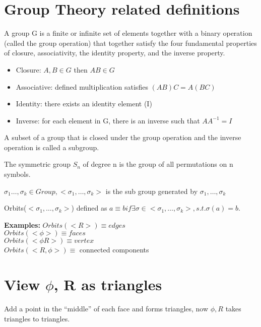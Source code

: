\documentclass[12pt]{article}
\newcommand{\eg}[1]{\par {\bf Examples: }{#1}}
\begin{document}
\section{Group Theory related definitions}
\begin{definition}
  A group G is a finite or infinite set of elements together with a
  binary operation (called the group operation) that together satisfy
  the four fundamental properties of closure, associativity, the
  identity property, and the inverse property.
  \begin{itemize}
  \item Closure: $A, B \in G$ then $A B \in G$
  \item Associative: defined multiplication satisfies $(A B) C = A (B C)$
  \item Identity: there exists an identity element (I)
  \item Inverse: for each element in G, there is an inverse such that $A A^{-1} = I$
  \end{itemize}
\end{definition}
\begin{definition}
  A subset of a group that is closed under the group operation and the
  inverse operation is called a subgroup.
\end{definition}
\begin{definition}
The symmetric group $S_n$ of degree n is the group of all permutations
on n symbols.
\end{definition}
\begin{definition}
  $\sigma_1 \dots, \sigma_k \in Group, <\sigma_1, \dots, \sigma_k>$
  is the sub group generated by $\sigma_1, \dots, \sigma_k$
\end{definition}
\begin{definition}
  Orbits($<\sigma_1, \dots, \sigma_k>$) defined as $a \equiv b if
  \exists \sigma \in <\sigma_1, \dots, \sigma_k>, s.t. \sigma(a) = b$.
\end{definition}
\eg {$Orbits(<R>) \equiv edges$}\\
{$Orbits(<\phi>) \equiv faces$}\\
{$Orbits(<\phi R>) \equiv vertex$}\\
{$Orbits(<R, \phi>) \equiv $ connected components}

\section{View $\phi$, R as triangles}
Add a point in the ``middle'' of each face and forms triangles, now $\phi, R$ takes triangles to triangles.
\end{document}
